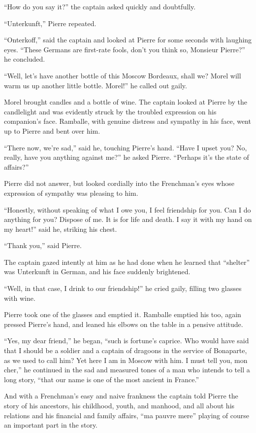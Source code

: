 ``How do you say it?'' the captain asked quickly and doubtfully.

``Unterkunft,'' Pierre repeated.

``Onterkoff,'' said the captain and looked at Pierre for some
seconds with laughing eyes. ``These Germans are first-rate fools,
don't you think so, Monsieur Pierre?'' he concluded.

``Well, let's have another bottle of this Moscow Bordeaux, shall
we?  Morel will warm us up another little bottle. Morel!'' he
called out gaily.

Morel brought candles and a bottle of wine. The captain looked at
Pierre by the candlelight and was evidently struck by the
troubled expression on his companion's face. Ramballe, with
genuine distress and sympathy in his face, went up to Pierre and
bent over him.

``There now, we're sad,'' said he, touching Pierre's hand. ``Have
I upset you? No, really, have you anything against me?'' he asked
Pierre.  ``Perhaps it's the state of affairs?''

Pierre did not answer, but looked cordially into the Frenchman's
eyes whose expression of sympathy was pleasing to him.

``Honestly, without speaking of what I owe you, I feel friendship
for you. Can I do anything for you? Dispose of me. It is for life
and death.  I say it with my hand on my heart!'' said he,
striking his chest.

``Thank you,'' said Pierre.

The captain gazed intently at him as he had done when he learned
that ``shelter'' was Unterkunft in German, and his face suddenly
brightened.

``Well, in that case, I drink to our friendship!'' he cried
gaily, filling two glasses with wine.

Pierre took one of the glasses and emptied it. Ramballe emptied
his too, again pressed Pierre's hand, and leaned his elbows on
the table in a pensive attitude.

``Yes, my dear friend,'' he began, ``such is fortune's
caprice. Who would have said that I should be a soldier and a
captain of dragoons in the service of Bonaparte, as we used to
call him? Yet here I am in Moscow with him. I must tell you, mon
cher,'' he continued in the sad and measured tones of a man who
intends to tell a long story, ``that our name is one of the most
ancient in France.''

And with a Frenchman's easy and naive frankness the captain told
Pierre the story of his ancestors, his childhood, youth, and
manhood, and all about his relations and his financial and family
affairs, ``ma pauvre mere'' playing of course an important part
in the story.

